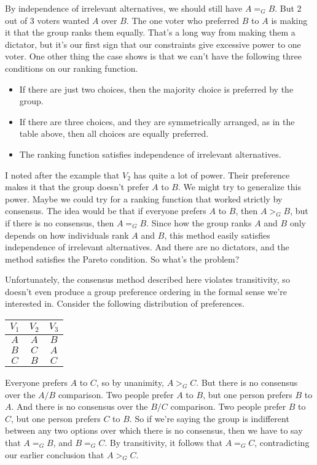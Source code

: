 \documentclass[11pt,]{article}
\providecommand{\tightlist}{%
  \setlength{\itemsep}{0pt}\setlength{\parskip}{0pt}}
\begin{document}
By independence of irrelevant alternatives, we should still have
\(A =_G B\). But 2 out of 3 voters wanted \(A\) over \(B\). The one
voter who preferred \(B\) to \(A\) is making it that the group ranks
them equally. That's a long way from making them a dictator, but it's
our first sign that our constraints give excessive power to one voter.
One other thing the case shows is that we can't have the following three
conditions on our ranking function.

\begin{itemize}
\tightlist
\item
  If there are just two choices, then the majority choice is preferred
  by the group.
\item
  If there are three choices, and they are symmetrically arranged, as in
  the table above, then all choices are equally preferred.
\item
  The ranking function satisfies independence of irrelevant
  alternatives.
\end{itemize}

I noted after the example that \(V_2\) has quite a lot of power. Their
preference makes it that the group doesn't prefer \(A\) to \(B\). We
might try to generalize this power. Maybe we could try for a ranking
function that worked strictly by consensus. The idea would be that if
everyone prefers \(A\) to \(B\), then \(A >_G B\), but if there is no
consensus, then \(A =_G B\). Since how the group ranks \(A\) and \(B\)
only depends on how individuals rank \(A\) and \(B\), this method easily
satisfies independence of irrelevant alternatives. And there are no
dictators, and the method satisfies the Pareto condition. So what's the
problem?

Unfortunately, the consensus method described here violates
transitivity, so doesn't even produce a group preference ordering in the
formal sense we're interested in. Consider the following distribution of
preferences.

\begin{longtable}[]{@{}ccc@{}}
\toprule
\(V_1\) & \(V_2\) & \(V_3\)\tabularnewline
\midrule
\endhead
\(A\) & \(A\) & \(B\)\tabularnewline
\(B\) & \(C\) & \(A\)\tabularnewline
\(C\) & \(B\) & \(C\)\tabularnewline
\bottomrule
\end{longtable}

Everyone prefers \(A\) to \(C\), so by unanimity, \(A >_G C\). But there
is no consensus over the \(A/B\) comparison. Two people prefer \(A\) to
\(B\), but one person prefers \(B\) to \(A\). And there is no consensus
over the \(B/C\) comparison. Two people prefer \(B\) to \(C\), but one
person prefers \(C\) to \(B\). So if we're saying the group is
indifferent between any two options over which there is no consensus,
then we have to say that \(A =_G B\), and \(B =_G C\). By transitivity,
it follows that \(A =_G C\), contradicting our earlier conclusion that
\(A >_G C\).
\end{document}
